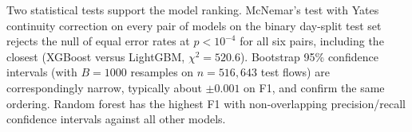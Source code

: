Two statistical tests support the model ranking. McNemar's test with
Yates continuity correction on every pair of models on the binary
day-split test set rejects the null of equal error rates at $p < 10^{-4}$
for all six pairs, including the closest (XGBoost versus LightGBM,
$\chi^2 = 520.6$). Bootstrap 95\% confidence intervals (with
$B = 1000$ resamples on $n = 516{,}643$ test flows) are correspondingly
narrow, typically about $\pm 0.001$ on F1, and confirm the same ordering.
Random forest has the highest F1 with non-overlapping precision/recall
confidence intervals against all other models.
